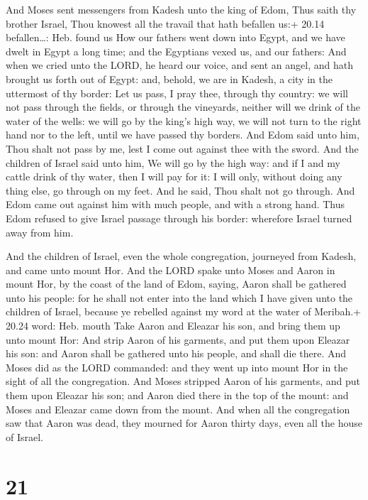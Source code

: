  And Moses sent messengers from Kadesh unto the king of
Edom, Thus saith thy brother Israel, Thou knowest all the travail that
hath befallen us:+ 20.14 befallen\ldots: Heb. found us  How
our fathers went down into Egypt, and we have dwelt in Egypt a long
time; and the Egyptians vexed us, and our fathers:  And
when we cried unto the LORD, he heard our voice, and sent an angel, and
hath brought us forth out of Egypt: and, behold, we are in Kadesh, a
city in the uttermost of thy border:  Let us pass, I pray
thee, through thy country: we will not pass through the fields, or
through the vineyards, neither will we drink of the water of the wells:
we will go by the king's high way, we will not turn to the right hand
nor to the left, until we have passed thy borders.  And
Edom said unto him, Thou shalt not pass by me, lest I come out against
thee with the sword.  And the children of Israel said unto
him, We will go by the high way: and if I and my cattle drink of thy
water, then I will pay for it: I will only, without doing any thing
else, go through on my feet.  And he said, Thou shalt not
go through. And Edom came out against him with much people, and with a
strong hand.  Thus Edom refused to give Israel passage
through his border: wherefore Israel turned away from him.

 And the children of Israel, even the whole congregation,
journeyed from Kadesh, and came unto mount Hor.  And the
LORD spake unto Moses and Aaron in mount Hor, by the coast of the land
of Edom, saying,  Aaron shall be gathered unto his people:
for he shall not enter into the land which I have given unto the
children of Israel, because ye rebelled against my word at the water of
Meribah.+ 20.24 word: Heb. mouth  Take Aaron and Eleazar
his son, and bring them up unto mount Hor:  And strip Aaron
of his garments, and put them upon Eleazar his son: and Aaron shall be
gathered unto his people, and shall die there.  And Moses
did as the LORD commanded: and they went up into mount Hor in the sight
of all the congregation.  And Moses stripped Aaron of his
garments, and put them upon Eleazar his son; and Aaron died there in the
top of the mount: and Moses and Eleazar came down from the mount.
 And when all the congregation saw that Aaron was dead,
they mourned for Aaron thirty days, even all the house of Israel.

\hypertarget{section-20}{%
\section{21}\label{section-20}}

